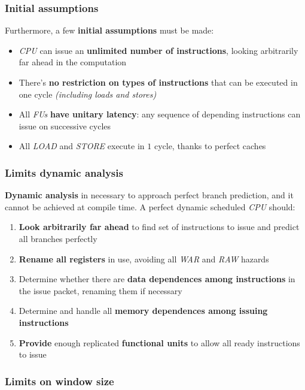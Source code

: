 \documentclass[english]{article}
\begin{document}
\subsubsection{Initial assumptions}

Furthermore, a few \textbf{initial assumptions} must be made:

\begin{itemize}
  \item \textit{CPU} can issue an\textbf{ unlimited number of instructions}, looking arbitrarily far ahead in the computation
  \item There's \textbf{no restriction on types of instructions} that can be executed in one cycle \textit{(including loads and stores)}
  \item All \textit{FUs} \textbf{have unitary latency}: any sequence of depending instructions can issue on successive cycles
  \item All \textit{LOAD} and \textit{STORE} execute in \(1\) cycle, thanks to perfect caches
\end{itemize}

\subsubsection{Limits dynamic analysis}

\textbf{Dynamic analysis} in necessary to approach perfect branch prediction, and it cannot be achieved at compile time.
A perfect dynamic scheduled \textit{CPU} should:

\begin{enumerate}
  \item \textbf{Look arbitrarily far ahead} to find set of instructions to issue and predict all branches perfectly
  \item \textbf{Rename all registers} in use, avoiding all \textit{WAR} and \textit{RAW} hazards
  \item Determine whether there are \textbf{data dependences among instructions} in the issue packet, renaming them if necessary
  \item Determine and handle all \textbf{memory dependences among issuing instructions}
  \item \textbf{Provide} enough replicated \textbf{functional units} to allow all ready instructions to issue
\end{enumerate}

\subsubsection{Limits on window size}
\end{document}
